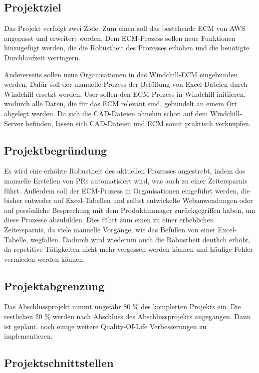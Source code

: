 \subsection{Projektziel} 
\label{sec:Projektziel}
Das Projekt verfolgt zwei Ziele.
Zum einen soll das bestehende \ac{ECM} von \ac{AWS} angepasst und erweitert werden.
Dem \ac{ECM}-Prozess sollen neue Funktionen hinzugefügt werden, die die Robustheit des Prozesses erhöhen und die benötigte Durchlaufzeit verringern.

Andererseits sollen neue Organisationen in das Windchill-\ac{ECM} eingebunden werden.
Dafür soll der manuelle Prozess der Befüllung von Excel-Dateien durch Windchill ersetzt werden.
User sollen den \ac{ECM}-Prozess in Windchill initiieren, wodurch alle Daten, die für das \ac{ECM} relevant sind, gebündelt an einem Ort abgelegt werden.
Da sich die CAD-Dateien ohnehin schon auf dem Windchill-Server befinden, lassen sich CAD-Dateien und \ac{ECM} somit praktisch verknüpfen.

\subsection{Projektbegründung} 
\label{sec:Projektbegruendung}
Es wird eine erhöhte Robustheit des aktuellen Prozesses angestrebt, indem das manuelle Erstellen von \acp{PR} automatisiert wird, was auch zu einer Zeitersparnis führt.
Außerdem soll der \ac{ECM}-Prozess in Organisationen eingeführt werden, die bisher entweder auf Excel-Tabellen und selbst entwickelte Webanwendungen oder auf persönliche Besprechung mit dem Produktmanager zurückgegriffen haben, um diese Prozesse abzubilden.
Dies führt zum einen zu einer erheblichen Zeitersparnis, da viele manuelle Vorgänge, wie das Befüllen von einer Excel-Tabelle, wegfallen.
Dadurch wird wiederum auch die Robustheit deutlich erhöht, da repetitive Tätigkeiten nicht mehr vergessen werden können und häufige Fehler vermieden werden können.

\subsection{Projektabgrenzung}
Das Abschlussprojekt nimmt ungefähr 80 \% des kompletten Projekts ein.
Die restlichen 20 \% werden nach Abschluss des Abschlussprojekts angegangen.
Dann ist geplant, noch einige weitere Quality-Of-Life Verbesserungen zu implementieren.

\subsection{Projektschnittstellen}
\label{sec:Projektschnittstellen}

